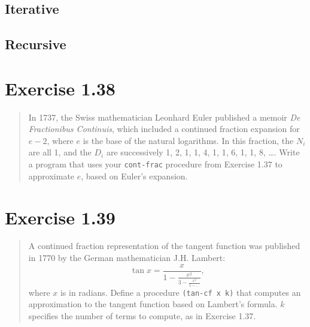 \documentclass{article}
\begin{document}
\subsection{Iterative}


\subsection{Recursive}


\section{Exercise 1.38}
\begin{quote}
    In 1737, the Swiss mathematician Leonhard Euler published a memoir
    \textit{De Fractionibus Continuis}, which included a continued fraction
    expansion for $e−2$, where $e$ is the base of the natural logarithms. In
    this fraction, the $N_i$ are all 1, and the $D_i$ are successively 1, 2, 1,
    1, 4, 1, 1, 6, 1, 1, 8, \ldots. Write a program that uses your
    \texttt{cont-frac} procedure from Exercise 1.37 to approximate $e$, based
    on Euler’s expansion.
\end{quote}



\section{Exercise 1.39}
\begin{quote}
    A continued fraction representation of the tangent function was published
    in 1770 by the German mathematician J.H. Lambert:
    \begin{equation*}
        \tan{x}= \frac{x}{1-\frac{x^2}{3-\frac{x^2}{5-\ldots}}},
    \end{equation*}
    where $x$ is in radians. Define a procedure \texttt{(tan-cf x k)} that
    computes an approximation to the tangent function based on Lambert’s
    formula. $k$ specifies the number of terms to compute, as in Exercise 1.37.
\end{quote}


\end{document}
